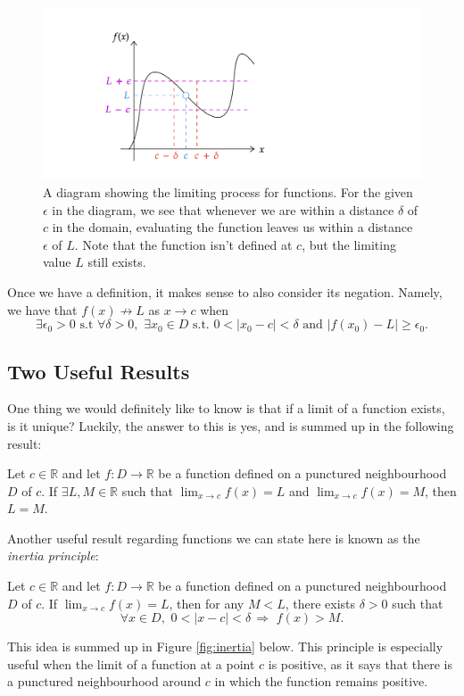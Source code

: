 \documentclass[
  17pt,
  a4paper]{extarticle}
\theoremstyle{plain}
\theoremstyle{definition}
\theoremstyle{plain}
\theoremstyle{plain}
\theoremstyle{plain}
\theoremstyle{plain}
\theoremstyle{definition}
\theoremstyle{definition}
\theoremstyle{remark}
\theoremstyle{remark}
\let\BeginKnitrBlock\begin \let\EndKnitrBlock\end
\renewcommand{\;}{\,}
\begin{document}
\begin{figure}
\includegraphics[width=\Width,height=\Height]{Functionlimit} \caption{A diagram showing the limiting process for functions. For the given $\epsilon$ in the diagram, we see that whenever we are within a distance $\delta$ of $c$ in the domain, evaluating the function leaves us within a distance $\epsilon$ of $L$. Note that the function isn't defined at $c$, but the limiting value $L$ still exists.}\label{fig:funclim}
\end{figure}

Once we have a definition, it makes sense to also consider its negation. Namely, we have that \(f(x) \not\to L\) as \(x \to c\) when \[\exists \epsilon_0 > 0\;\;\text{s.t}\;\;\forall \delta > 0,\;\; \exists x_0 \in D \;\; \text{s.t.}\;\; 0 < \lvert x_0 - c \rvert < \delta\;\; \text{and}\;\; \lvert f(x_0) - L \rvert \geq \epsilon_0.\]

\hypertarget{two-useful-results}{%
\subsection{Two Useful Results}\label{two-useful-results}}

One thing we would definitely like to know is that if a limit of a function exists, is it unique? Luckily, the answer to this is yes, and is summed up in the following result:
\BeginKnitrBlock{proposition}[Uniqueness of Limits]
{\label{prp:prop1} }Let \(c\in\mathbb{R}\) and let \(f:D \to \mathbb{R}\) be a function defined on a punctured neighbourhood \(D\) of \(c\). If \(\exists L, M \in \mathbb{R}\) such that \(\lim_{x\to c} f(x) = L\) and \(\lim_{x\to c} f(x) = M\), then \(L=M\).
\EndKnitrBlock{proposition}

Another useful result regarding functions we can state here is known as the \emph{inertia principle}:
\BeginKnitrBlock{proposition}[Inertia]
{\label{prp:prop2} }Let \(c\in\mathbb{R}\) and let \(f:D \to \mathbb{R}\) be a function defined on a punctured neighbourhood \(D\) of \(c\). If \(\lim_{x\to c} f(x) = L\), then for any \(M < L\), there exists \(\delta > 0\) such that \[\forall x \in D,\;\; 0 < \lvert x - c \rvert < \delta \; \Rightarrow \;\; f(x) > M.\]
\EndKnitrBlock{proposition}
This idea is summed up in Figure \ref{fig:inertia} below. This principle is especially useful when the limit of a function at a point \(c\) is positive, as it says that there is a punctured neighbourhood around \(c\) in which the function remains positive.
\end{document}
